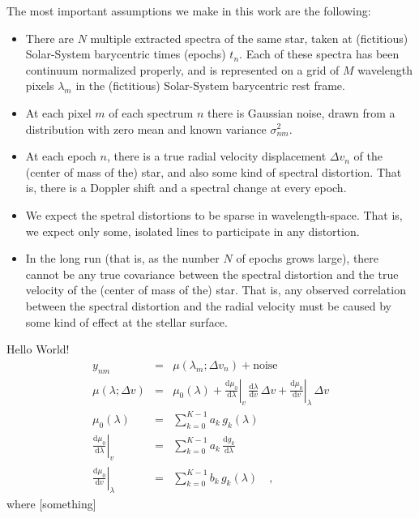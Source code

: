 \documentclass[12pt, letterpaper]{article}
\newcommand{\dd}{\mathrm{d}}
\begin{document}
The most important assumptions we make in this work are the following:
\begin{itemize}\itemsep=0ex
\item There are $N$ multiple extracted spectra of the same star, taken
  at (fictitious) Solar-System barycentric times (epochs) $t_n$. Each
  of these spectra has been continuum normalized properly, and is
  represented on a grid of $M$ wavelength pixels $\lambda_m$ in the
  (fictitious) Solar-System barycentric rest frame.
\item At each pixel $m$ of each spectrum $n$ there is Gaussian noise,
  drawn from a distribution with zero mean and known variance
  $\sigma^2_{nm}$.
\item At each epoch $n$, there is a true radial velocity displacement
  $\Delta v_n$ of the (center of mass of the) star, and also some kind
  of spectral distortion.  That is, there is a Doppler shift and a
  spectral change at every epoch.
\item We expect the spetral distortions to be sparse in
  wavelength-space.  That is, we expect only some, isolated lines to
  participate in any distortion.
\item In the long run (that is, as the number $N$ of epochs grows
  large), there cannot be any true covariance between the spectral
  distortion and the true velocity of the (center of mass of the)
  star. That is, any observed correlation between the spectral
  distortion and the radial velocity must be caused by some kind of
  effect at the stellar surface.
\end{itemize}

Hello World!
\begin{eqnarray}
  y_{nm} &=& \mu(\lambda_m; \Delta v_n) + \mathrm{noise}
  \\
  \mu(\lambda; \Delta v) &=& \mu_0(\lambda)
  + \left.\frac{\dd \mu_0}{\dd\lambda}\right|_{v}\,\frac{\dd\lambda}{\dd v}\,\Delta v
  + \left.\frac{\dd \mu_0}{\dd v}\right|_{\lambda}\,\Delta v
  \\
  \mu_0(\lambda) &=& \sum_{k=0}^{K-1} a_k\,g_k(\lambda)
  \\
  \left.\frac{\dd \mu_0}{\dd\lambda}\right|_{v} &=& \sum_{k=0}^{K-1} a_k\,\frac{\dd g_k}{\dd\lambda}
  \\
  \left.\frac{\dd \mu_0}{\dd v}\right|_{\lambda} &=& \sum_{k=0}^{K-1} b_k\,g_k(\lambda)
  \quad ,
\end{eqnarray}
where [something]
\end{document}
